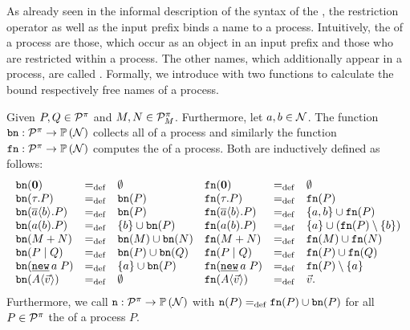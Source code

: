 As already seen in the informal description of the syntax of the \picalc{}, the restriction operator as well as the input prefix binds a name to a process. Intuitively, the  of a process are those, which occur as an object in an input prefix and those who are restricted within a process. The other names, which additionally appear in a process, are called . Formally, we introduce with  two functions to calculate the bound respectively free names of a process. 

\begin{definition}
\label{def_bound_free_names}%
Given $P,Q\in\mathcal P^{\pi}$ and $M,N\in\mathcal P^{\pi}_{M}$. Furthermore, let $a,b\in\mathcal N$. The function $\mathtt{bn}:\mathcal P^{\pi}\rightarrow\mathbb P\left(\mathcal N\right)$ collects all  of a process and similarly the function $\mathtt{fn}:\mathcal P^{\pi}\rightarrow\mathbb P\left(\mathcal N\right)$ computes the  of a process. Both are inductively defined as follows:
\begin{equation*}	
	\begin{aligned}			
		\begin{array}{lcl}
			\bn{\proczero} &\define& \emptyset \\
			\bn{\tau.P} &\define& \bn{P}\\
			\bn{\out{a}{b}.P} &\define& \bn{P} \\
			\bn{\inp{a}{b}.P} &\define&\set{b}\cup\bn{P}\\
			\bn{\procchoice{M}{N}} &\define& \bn{M}\cup\bn{N}\\
			\bn{\procpar{P}{Q}} &\define& \bn{P}\cup\bn{Q} \\
			\bn{\procres{a}{P}} &\define& \set{a}\cup\bn{P} \\
			\bn{\proccall{A}{\vec{v}}} &\define& \emptyset
		\end{array}
	\end{aligned}
	\begin{aligned}
		\begin{array}{lcl}
			\fn{\proczero} &\define& \emptyset \\
			\fn{\tau.P} &\define &\fn{P} \\
			\fn{\out{a}{b}.P} &\define& \set{a,b}\cup\fn{P} \\
			\fn{\inp{a}{b}.P} &\define& \set{a}\cup\left(\fn{P}\setminus\set{b}\right) \\
			\fn{\procchoice{M}{N}} &\define &\fn{M}\cup\fn{N} \\
			\fn{\procpar{P}{Q}} &\define& \fn{P}\cup\fn{Q} \\
			\fn{\procres{a}{P}}& \define& \fn{P}\setminus\set{a} \\
			\fn{\proccall{A}{\vec{v}}}& \define& \vec{v}.
		\end{array}
	\end{aligned}
\end{equation*}
Furthermore, we call $\mathtt{n}:\mathcal P^{\pi}\rightarrow\mathbb P\left(\mathcal N\right)$ with $\mathtt{n}(P)=_{\mathrm{def}} \mathtt{fn}(P)\cup\mathtt{bn}(P)$ for all $P\in\mathcal P^{\pi}$ the  of a process $P$.
\end{definition}
